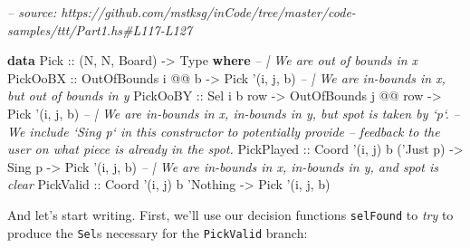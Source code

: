 \documentclass[]{article}
\newenvironment{Shaded}{}{}
\newcommand{\CommentTok}[1]{\textcolor[rgb]{0.38,0.63,0.69}{\textit{#1}}}
\newcommand{\DataTypeTok}[1]{\textcolor[rgb]{0.56,0.13,0.00}{#1}}
\newcommand{\FunctionTok}[1]{\textcolor[rgb]{0.02,0.16,0.49}{#1}}
\newcommand{\KeywordTok}[1]{\textcolor[rgb]{0.00,0.44,0.13}{\textbf{#1}}}
\newcommand{\NormalTok}[1]{#1}
\newcommand{\OtherTok}[1]{\textcolor[rgb]{0.00,0.44,0.13}{#1}}
\begin{document}
\begin{Shaded}
\begin{Highlighting}[]
\CommentTok{-- source: https://github.com/mstksg/inCode/tree/master/code-samples/ttt/Part1.hs#L117-L127}

\KeywordTok{data} \DataTypeTok{Pick}\OtherTok{ ::}\NormalTok{ (}\DataTypeTok{N}\NormalTok{, }\DataTypeTok{N}\NormalTok{, }\DataTypeTok{Board}\NormalTok{) }\OtherTok{->} \DataTypeTok{Type} \KeywordTok{where}
    \CommentTok{-- | We are out of bounds in x}
    \DataTypeTok{PickOoBX}\OtherTok{   ::} \DataTypeTok{OutOfBounds}\NormalTok{ i }\FunctionTok{@@}\NormalTok{ b                         }\OtherTok{->} \DataTypeTok{Pick}\NormalTok{ '(i, j, b)}
    \CommentTok{-- | We are in-bounds in x, but out of bounds in y}
    \DataTypeTok{PickOoBY}\OtherTok{   ::} \DataTypeTok{Sel}\NormalTok{ i b row        }\OtherTok{->} \DataTypeTok{OutOfBounds}\NormalTok{ j }\FunctionTok{@@}\NormalTok{ row }\OtherTok{->} \DataTypeTok{Pick}\NormalTok{ '(i, j, b)}
    \CommentTok{-- | We are in-bounds in x, in-bounds in y, but spot is taken by `p`.}
    \CommentTok{-- We include `Sing p` in this constructor to potentially provide}
    \CommentTok{-- feedback to the user on what piece is already in the spot.}
    \DataTypeTok{PickPlayed}\OtherTok{ ::} \DataTypeTok{Coord}\NormalTok{ '(i, j) b ('}\DataTypeTok{Just}\NormalTok{ p) }\OtherTok{->} \DataTypeTok{Sing}\NormalTok{ p        }\OtherTok{->} \DataTypeTok{Pick}\NormalTok{ '(i, j, b)}
    \CommentTok{-- | We are in-bounds in x, in-bounds in y, and spot is clear}
    \DataTypeTok{PickValid}\OtherTok{  ::} \DataTypeTok{Coord}\NormalTok{ '(i, j) b '}\DataTypeTok{Nothing}                   \OtherTok{->} \DataTypeTok{Pick}\NormalTok{ '(i, j, b)}
\end{Highlighting}
\end{Shaded}

And let's start writing. First, we'll use our decision functions
\texttt{selFound} to \emph{try} to produce the \texttt{Sel}s necessary for the
\texttt{PickValid} branch:

\begin{Shaded}
\end{Shaded}
\end{document}
